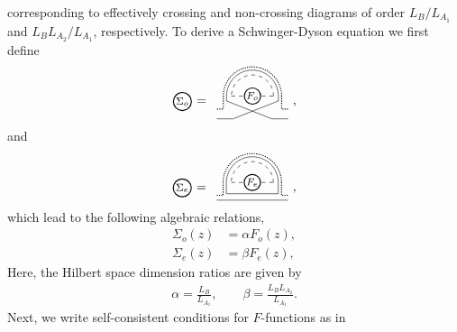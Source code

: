 \documentclass[aps,pra,groupedaddress,onecolumn,notitlepage,superscriptaddress,10pt]{revtex4-1}
\begin{document}
corresponding to effectively crossing and non-crossing diagrams of order $L_B/L_{A_1}$ and $L_B L_{A_2}/L_{A_1}$, respectively.
To derive a Schwinger-Dyson equation we first define 
\begin{align}
\tikz[baseline=-0.5ex]{
    \draw[thick] (0,0) circle (0.25) node[anchor=center] {\footnotesize $\Sigma_o$};
    }
=
\ \,
\tikz[scale=.9,baseline=-1.5ex]{
    \draw[dashed] (-0.15,0) -- (1.15,0);
    \draw[thick,fill=white] (0.5,0) circle (0.25) node[anchor=center] {\footnotesize$F_o$};
    \draw (-0.3,0.0)-- (-0.3,-0.15);
    \draw (-0.3,-0.15)-- (1.1,-0.7);
    \draw (1.3,-0.15)-- (1.3,0.0);
    \draw (1.3,-0.15)-- (-0.1,-0.7);
    \draw (-0.6,-0.7)-- (-0.1,-0.7);
    \draw (1.1,-0.7)-- (1.6,-0.7);
    \draw[densely dotted,thick]   (-0.4,0.0)-- (-0.4,-0.4)--  (-0.6,-0.4);
    \draw[densely dotted,thick] (1.4,0.0) -- (1.4,-0.4) -- (1.6,-0.4) ;
    \draw[dashed] (1.15,0) arc (0:180:0.65);
    \draw (1.3,0) arc (0:180:0.8);
    \draw[densely dotted,thick] (1.4,0) arc (0:180:0.9);
    }\ ,
\end{align}
and
\begin{align}
\tikz[baseline=-0.5ex]{
    \draw[thick] (0,0) circle (0.25) node[anchor=center] {\footnotesize $\Sigma_e$};
    }
=
\ \,
\tikz[scale=.9,baseline=-1.5ex]{
    \draw[dashed] (-0.15,0) -- (1.15,0);
    \draw[thick,fill=white] (0.5,0) circle (0.25) node[anchor=center] {\footnotesize$F_e$};
    \draw (-0.3,0.0)-- (-0.3,-0.35)-- (1.3,-0.35) -- (1.3,0);
    \draw (-0.6,-0.55)-- (1.6,-0.55);
    \draw[densely dotted,thick]   (-0.4,0.0)-- (-0.4,-0.4)--  (-0.6,-0.4);
    \draw[densely dotted,thick] (1.4,0.0) -- (1.4,-0.4) -- (1.6,-0.4) ;
    \draw[dashed] (1.15,0) arc (0:180:0.65);
    \draw (1.3,0) arc (0:180:0.8);
    \draw[densely dotted,thick] (1.4,0) arc (0:180:0.9);
    }\ ,
\end{align}
which lead to the following algebraic relations,
\begin{align}
\Sigma_o(z)  &= \alpha F_o(z), \\
\Sigma_e(z)  &= \beta F_e(z), 
\end{align}
Here, the Hilbert space dimension ratios  are given by
\begin{align}
\alpha = \frac{L_B}{L_{A_1}}, \qquad
\beta= \frac{L_B L_{A_2}}{L_{A_1}}.
\end{align}
Next, we write self-consistent conditions for $F$-functions as in
\end{document}
